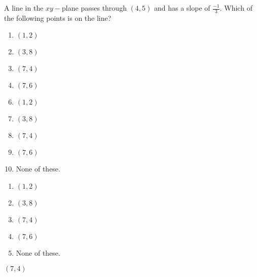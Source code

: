   
A line in the $xy-$plane passes through $(4,5)$ and has a slope of $\frac{-1}{3}$.  Which of the following points is on the line?\\  


\ifsat
	\begin{enumerate}[label=\Alph*)]
		\item $(1,2) $
		\item $(3,8) $
		\item $(7,4) $ %
		\item $(7,6) $
	\end{enumerate}
\else
\fi

\ifacteven
	\begin{enumerate}[label=\textbf{\Alph*.},itemsep=\fill,align=left]
		\setcounter{enumii}{5}
		\item $(1,2) $
		\item $(3,8) $
		\item $(7,4) $ %
		\addtocounter{enumii}{1}
		\item $(7,6) $
		\item None of these. 
	\end{enumerate}
\else
\fi

\ifactodd
	\begin{enumerate}[label=\textbf{\Alph*.},itemsep=\fill,align=left]
		\item $(1,2) $
		\item $(3,8) $
		\item $(7,4) $ %
		\item $(7,6) $
		\item None of these. 
	\end{enumerate}
\else
\fi

\ifgridin
 $(7,4) $ %
		
\else
\fi

